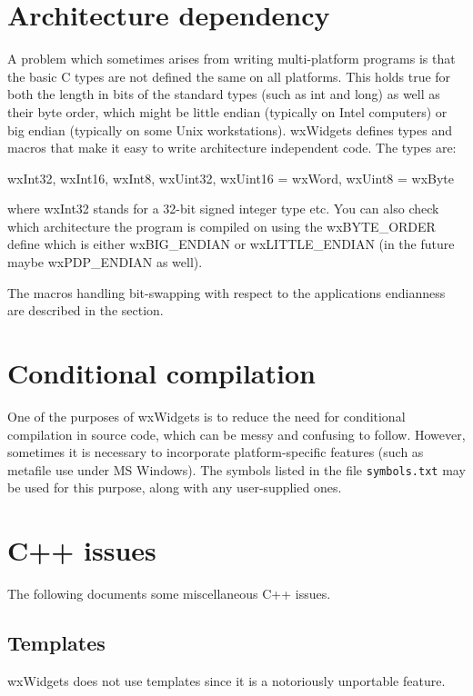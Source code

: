 \section{Architecture dependency}

A problem which sometimes arises from writing multi-platform programs is that
the basic C types are not defined the same on all platforms. This holds true
for both the length in bits of the standard types (such as int and long) as 
well as their byte order, which might be little endian (typically
on Intel computers) or big endian (typically on some Unix workstations). wxWidgets
defines types and macros that make it easy to write architecture independent
code. The types are:

wxInt32, wxInt16, wxInt8, wxUint32, wxUint16 = wxWord, wxUint8 = wxByte

where wxInt32 stands for a 32-bit signed integer type etc. You can also check
which architecture the program is compiled on using the wxBYTE\_ORDER define
which is either wxBIG\_ENDIAN or wxLITTLE\_ENDIAN (in the future maybe wxPDP\_ENDIAN
as well).

The macros handling bit-swapping with respect to the applications endianness
are described in the  section.

\section{Conditional compilation}

One of the purposes of wxWidgets is to reduce the need for conditional
compilation in source code, which can be messy and confusing to follow.
However, sometimes it is necessary to incorporate platform-specific
features (such as metafile use under MS Windows). The symbols
listed in the file {\tt symbols.txt} may be used for this purpose,
along with any user-supplied ones.

\section{C++ issues}

The following documents some miscellaneous C++ issues.

\subsection{Templates}

wxWidgets does not use templates since it is a notoriously unportable feature.


